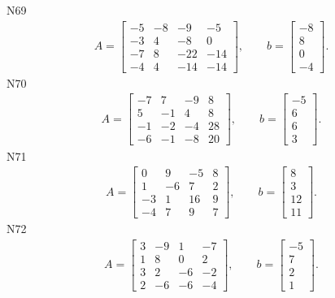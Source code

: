 \documentclass[11pt]{report}
\begin{document}
N69
\begin{align*}
 A = \left[\begin{matrix}-5 & -8 & -9 & -5\\-3 & 4 & -8 & 0\\-7 & 8 & -22 & -14\\-4 & 4 & -14 & -14\end{matrix}\right],
\qquad b = \left[\begin{matrix}-8\\8\\0\\-4\end{matrix}\right]. 
 \end{align*}
N70
\begin{align*}
 A = \left[\begin{matrix}-7 & 7 & -9 & 8\\5 & -1 & 4 & 8\\-1 & -2 & -4 & 28\\-6 & -1 & -8 & 20\end{matrix}\right],
\qquad b = \left[\begin{matrix}-5\\6\\6\\3\end{matrix}\right]. 
 \end{align*}
N71
\begin{align*}
 A = \left[\begin{matrix}0 & 9 & -5 & 8\\1 & -6 & 7 & 2\\-3 & 1 & 16 & 9\\-4 & 7 & 9 & 7\end{matrix}\right],
\qquad b = \left[\begin{matrix}8\\3\\12\\11\end{matrix}\right]. 
 \end{align*}
N72
\begin{align*}
 A = \left[\begin{matrix}3 & -9 & 1 & -7\\1 & 8 & 0 & 2\\3 & 2 & -6 & -2\\2 & -6 & -6 & -4\end{matrix}\right],
\qquad b = \left[\begin{matrix}-5\\7\\2\\1\end{matrix}\right]. 
 \end{align*}
\end{document}
